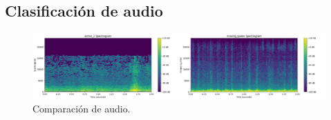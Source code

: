 \subsection{Clasificación de audio}

\begin{figure}[H]
    \centering
    \includegraphics[width=\textwidth]{assets/cap_3/comparacion_audio.png}
    \caption{Comparación de audio.}
    \label{fig:comparacion_audio}
\end{figure}